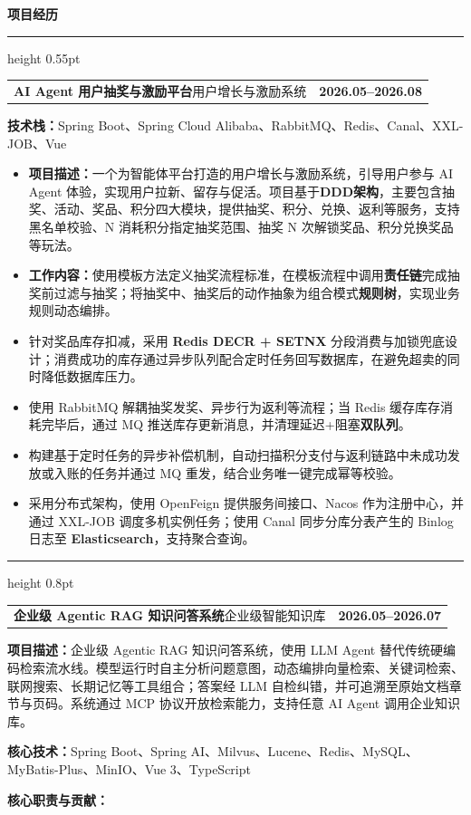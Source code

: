 \documentclass[UTF8,a4paper,9pt]{ctexart}
\makeatletter
\newcommand{\sectiontitle}[1]{%
  \vspace{1.5pt}%
  {\color{navy}\bfseries\fontsize{10.5pt}{11.5pt}\selectfont #1}\par
  \vspace{0.5pt}\color{navy}\hrule height 0.55pt\color{black}\vspace{1pt}%
}
\newcommand{\entry}[3]{%
  \begin{tabularx}{\linewidth}{@{}Xr@{}}
    \textbf{#1}\enspace\textbar\enspace #2 & \textbf{#3}
  \end{tabularx}%
}
\newcommand{\projectdivider}{%
  \vspace{2.5pt}\color{navy}\hrule height 0.8pt\color{black}\vspace{2pt}%
}
\makeatother
\begin{document}
\sectiontitle{项目经历}
\entry{AI Agent 用户抽奖与激励平台}{用户增长与激励系统}{2026.05--2026.08}
\textbf{技术栈：}Spring Boot、Spring Cloud Alibaba、RabbitMQ、Redis、Canal、XXL-JOB、Vue\par
\begin{itemize}
  \item \textbf{项目描述：}一个为智能体平台打造的用户增长与激励系统，引导用户参与 AI Agent 体验，实现用户拉新、留存与促活。项目基于\textbf{DDD架构}，主要包含抽奖、活动、奖品、积分四大模块，提供抽奖、积分、兑换、返利等服务，支持黑名单校验、N 消耗积分指定抽奖范围、抽奖 N 次解锁奖品、积分兑换奖品等玩法。
  \item \textbf{工作内容：}使用模板方法定义抽奖流程标准，在模板流程中调用\textbf{责任链}完成抽奖前过滤与抽奖；将抽奖中、抽奖后的动作抽象为组合模式\textbf{规则树}，实现业务规则动态编排。
  \item 针对奖品库存扣减，采用 \textbf{Redis DECR + SETNX} 分段消费与加锁兜底设计；消费成功的库存通过异步队列配合定时任务回写数据库，在避免超卖的同时降低数据库压力。
  \item 使用 RabbitMQ 解耦抽奖发奖、异步行为返利等流程；当 Redis 缓存库存消耗完毕后，通过 MQ 推送库存更新消息，并清理延迟+阻塞\textbf{双队列}。
  \item 构建基于定时任务的异步补偿机制，自动扫描积分支付与返利链路中未成功发放或入账的任务并通过 MQ 重发，结合业务唯一键完成幂等校验。
  \item 采用分布式架构，使用 OpenFeign 提供服务间接口、Nacos 作为注册中心，并通过 XXL-JOB 调度多机实例任务；使用 Canal 同步分库分表产生的 Binlog 日志至 \textbf{Elasticsearch}，支持聚合查询。
\end{itemize}
\projectdivider
\entry{企业级 Agentic RAG 知识问答系统}{企业级智能知识库}{2026.05--2026.07}
\textbf{项目描述：}企业级 Agentic RAG 知识问答系统，使用 LLM Agent 替代传统硬编码检索流水线。模型运行时自主分析问题意图，动态编排向量检索、关键词检索、联网搜索、长期记忆等工具组合；答案经 LLM 自检纠错，并可追溯至原始文档章节与页码。系统通过 MCP 协议开放检索能力，支持任意 AI Agent 调用企业知识库。\par
\textbf{核心技术：}Spring Boot、Spring AI、Milvus、Lucene、Redis、MySQL、MyBatis-Plus、MinIO、Vue 3、TypeScript\par
\textbf{核心职责与贡献：}
\end{document}
